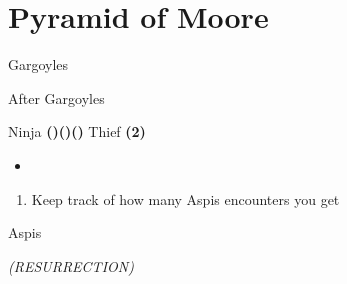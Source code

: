 \chapter{Pyramid of Moore}

\vspace{\baselineskip}

\begin{paracol}{2}

\begin{boss}{Gargoyles}
    \varwb
    \begin{round}{1}
        \faris \rightCommand{\gilToss}
        \cara \leftCommand{\gilToss}
        \bartz \rightCommand{\gilToss}
        \faris \rightCommand{\gilToss}
    \end{round}
    \varwe
\end{boss}

\begin{menu}{After Gargoyles}
    \varwb
    \begin{itemMenu}
        \hiPotionMenu {}
    \end{itemMenu}
    \begin{abilityMenu}
        \faris \ability{!\black}
    \end{abilityMenu}
    \begin{jobMenu}
        \cara Ninja \textbf{(\pointLeft)(\pointDown)(\pointLeft) \ability{!\white}}
        \bartz Thief \textbf{(2\pointRight)} \ability{!\combine} \optimize
        \begin{itemize}
            \item[] \equip{\stealthRobe, \greenBeret}
        \end{itemize}
    \end{jobMenu}
    \varwe
\end{menu}

\begin{enumerate}
    \item Keep track of how many Aspis encounters you get
\end{enumerate}

\switchcolumnTwice[*]
\begin{encounter}{Aspis}
    \varwb
    \begin{round}{1}
        \bartz \rightCommand{\combine} \then \battleGroup{\hiPotion \space + \phoenixDown} \textit{(RESURRECTION)} \then {} 
    \end{round}
    \varwe
\end{encounter}


\end{paracol}
